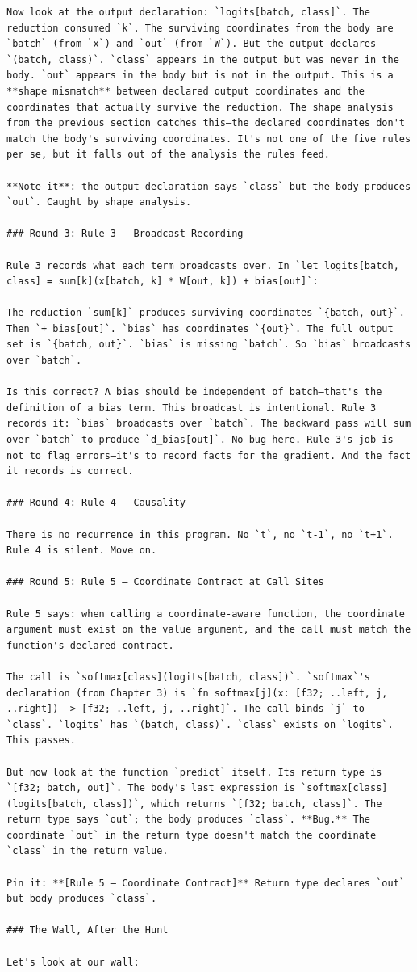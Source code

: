 \documentclass[11pt,titlepage]{article}
\begin{document}
\begin{verbatim}
Now look at the output declaration: `logits[batch, class]`. The reduction consumed `k`. The surviving coordinates from the body are `batch` (from `x`) and `out` (from `W`). But the output declares `(batch, class)`. `class` appears in the output but was never in the body. `out` appears in the body but is not in the output. This is a **shape mismatch** between declared output coordinates and the coordinates that actually survive the reduction. The shape analysis from the previous section catches this—the declared coordinates don't match the body's surviving coordinates. It's not one of the five rules per se, but it falls out of the analysis the rules feed.

**Note it**: the output declaration says `class` but the body produces `out`. Caught by shape analysis.

### Round 3: Rule 3 — Broadcast Recording

Rule 3 records what each term broadcasts over. In `let logits[batch, class] = sum[k](x[batch, k] * W[out, k]) + bias[out]`:

The reduction `sum[k]` produces surviving coordinates `{batch, out}`. Then `+ bias[out]`. `bias` has coordinates `{out}`. The full output set is `{batch, out}`. `bias` is missing `batch`. So `bias` broadcasts over `batch`.

Is this correct? A bias should be independent of batch—that's the definition of a bias term. This broadcast is intentional. Rule 3 records it: `bias` broadcasts over `batch`. The backward pass will sum over `batch` to produce `d_bias[out]`. No bug here. Rule 3's job is not to flag errors—it's to record facts for the gradient. And the fact it records is correct.

### Round 4: Rule 4 — Causality

There is no recurrence in this program. No `t`, no `t-1`, no `t+1`. Rule 4 is silent. Move on.

### Round 5: Rule 5 — Coordinate Contract at Call Sites

Rule 5 says: when calling a coordinate-aware function, the coordinate argument must exist on the value argument, and the call must match the function's declared contract.

The call is `softmax[class](logits[batch, class])`. `softmax`'s declaration (from Chapter 3) is `fn softmax[j](x: [f32; ..left, j, ..right]) -> [f32; ..left, j, ..right]`. The call binds `j` to `class`. `logits` has `(batch, class)`. `class` exists on `logits`. This passes.

But now look at the function `predict` itself. Its return type is `[f32; batch, out]`. The body's last expression is `softmax[class](logits[batch, class])`, which returns `[f32; batch, class]`. The return type says `out`; the body produces `class`. **Bug.** The coordinate `out` in the return type doesn't match the coordinate `class` in the return value.

Pin it: **[Rule 5 — Coordinate Contract]** Return type declares `out` but body produces `class`.

### The Wall, After the Hunt

Let's look at our wall:
\end{verbatim}
\end{document}
